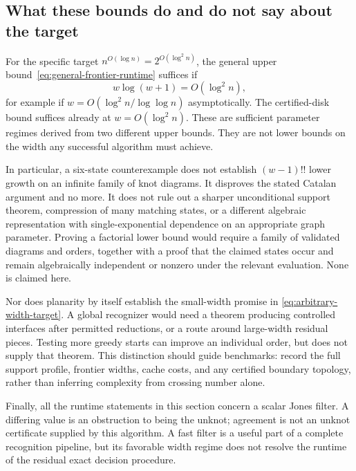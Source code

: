 \subsection{What these bounds do and do not say about the target}

For the specific target $n^{O(\log n)}=2^{O(\log^2 n)}$, the general upper
bound~\eqref{eq:general-frontier-runtime} suffices if
\begin{equation}
 w\log(w+1)=O(\log^2 n),
 \label{eq:arbitrary-width-target}
\end{equation}
for example if $w=O(\log^2 n/\log\log n)$ asymptotically.  The certified-disk
bound suffices already at $w=O(\log^2 n)$.  These are sufficient parameter
regimes derived from two different upper bounds.  They are not lower bounds
on the width any successful algorithm must achieve.

In particular, a six-state counterexample does not establish
$(w-1)!!$ lower growth on an infinite family of knot diagrams.  It disproves
the stated Catalan argument and no more.  It does not rule out a sharper
unconditional support theorem, compression of many matching states, or a
different algebraic representation with single-exponential dependence on an
appropriate graph parameter.  Proving a factorial lower bound would require
a family of validated diagrams and orders, together with a proof that the
claimed states occur and remain algebraically independent or nonzero under
the relevant evaluation.  None is claimed here.

Nor does planarity by itself establish the small-width promise in
\eqref{eq:arbitrary-width-target}.  A global recognizer would need a theorem
producing controlled interfaces after permitted reductions, or a route around
large-width residual pieces.  Testing more greedy starts can improve an
individual order, but does not supply that theorem.  This distinction should
guide benchmarks: record the full support profile, frontier widths, cache
costs, and any certified boundary topology, rather than inferring complexity
from crossing number alone.

Finally, all the runtime statements in this section concern a scalar Jones
filter.  A differing value is an obstruction to being the unknot; agreement
is not an unknot certificate supplied by this algorithm.  A fast filter is a
useful part of a complete recognition pipeline, but its favorable width regime
does not resolve the runtime of the residual exact decision procedure.
